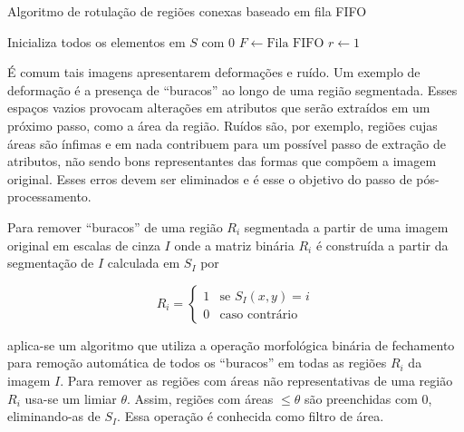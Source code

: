 \begin{espacosimples}
\begin{algorithm2e}[H]
  \caption{Algoritmo de rotulação de regiões conexas baseado em fila FIFO}
  \label{algo:conexo}
  \SetAlgoLined

  Inicializa todos os elementos em $S$ com $0$\;
  $F \gets \text{Fila FIFO}$\;
  $r \gets 1$\;


\end{algorithm2e}
\end{espacosimples}

\vspace{1.0cm}

É comum tais imagens apresentarem deformações e ruído. Um exemplo de
deformação é a presença de ``buracos'' ao longo de uma região
segmentada. Esses espaços vazios provocam alterações em atributos que
serão extraídos em um próximo passo, como a área da região. Ruídos
são, por exemplo, regiões cujas áreas são ínfimas e em nada contribuem
para um possível passo de extração de atributos, não sendo bons
representantes das formas que compõem a imagem original. Esses erros
devem ser eliminados e é esse o objetivo do passo de
pós-processamento.

Para remover ``buracos'' de uma região $R_i$ segmentada a partir de
uma imagem original em escalas de cinza $I$ onde a matriz binária
$R_i$ é construída a partir da segmentação de $I$ calculada em $S_I$ por

\begin{equation}
  R_i = 
  \begin{cases}
    1 & \text{se $S_I(x,y) = i$} \\
    0 & \text{caso contrário}
  \end{cases}
\end{equation}

\noindent aplica-se um algoritmo que utiliza a operação morfológica binária de fechamento para remoção automática de todos os ``buracos'' em todas as regiões $R_i$ da imagem $I$. Para remover as regiões com áreas não representativas de uma região
$R_i$ usa-se um limiar $\theta$. Assim, regiões com áreas $\leq
\theta$ são preenchidas com $0$, eliminando-as de $S_I$. Essa operação
é conhecida como filtro de área.~\cite{gonzalez}

